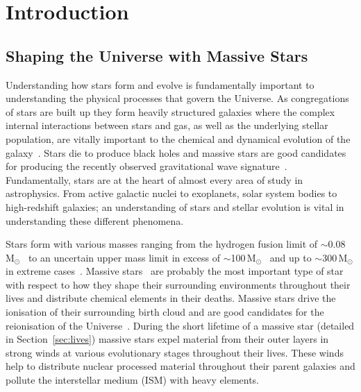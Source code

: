 \chapter{Introduction}\label{ch:intro}

\section{Shaping the Universe with Massive Stars} %
\label{sec:massive_stars}
Understanding how stars form and evolve is fundamentally important to understanding the physical processes that govern the Universe.
As congregations of stars are built up they form heavily structured galaxies where the complex internal interactions between stars and gas, as well as the underlying stellar population, are vitally important to the chemical and dynamical evolution of the galaxy~\citep[e.g.][]{2014ARA&A..52..291C}.
Stars die to produce black holes and massive stars are good candidates for producing the recently observed gravitational wave signature~\citep{2016PhRvL.116f1102A,2016arXiv160204735L,2016arXiv160300511W}.
Fundamentally, stars are at the heart of almost every area of study in astrophysics.
From active galactic nuclei to exoplanets, solar system bodies to high-redshift galaxies; an understanding of stars and stellar evolution is vital in understanding these different phenomena.

Stars form with various masses ranging from the hydrogen fusion limit of $\sim$0.08\,M$_{\odot}$~\citep{1997ApJ...491..856B,2000ARA&A..38..337C} to an uncertain upper mass limit in excess of $\sim$100\,M$_{\odot}$~\citep[e.g.][]{2005Natur.434..192F,2012MNRAS.422..794E,2014A&A...568L..13W} and up to $\sim$300\,M$_{\odot}$ in extreme cases~\citep{2010MNRAS.408..731C}.
Massive stars~\citep[defined here as stars with initial masses $>$8\,M$_{\odot}$, e.g.][and expanded upon in Section~\ref{sec:lives}]{2014ARA&A..52..487S} are probably the most important type of star with respect to how they shape their surrounding environments throughout their lives and distribute chemical elements in their deaths.
Massive stars drive the ionisation of their surrounding birth cloud and are good candidates for the reionisation of the Universe~\citep[e.g.][]{1997ApJ...483...21H,2005SSRv..116..625C,2006ARA&A..44..415F}.
During the short lifetime of a massive star (detailed in Section~\ref{sec:lives}) massive stars expel material from their outer layers in strong winds at various evolutionary stages throughout their lives.
These winds help to distribute nuclear processed material throughout their parent galaxies and pollute the interstellar medium (ISM) with heavy elements.

